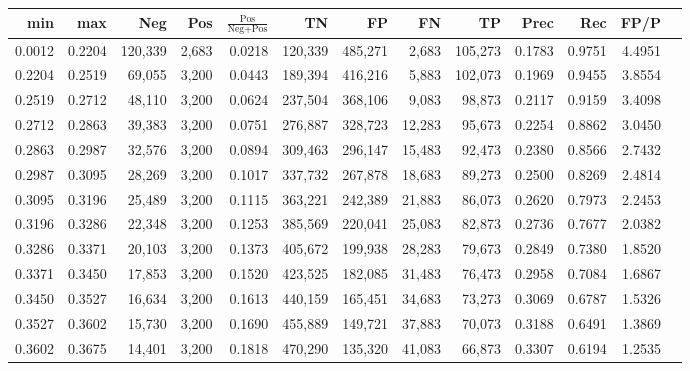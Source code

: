 \begin{tabular}{rrrrrrrrrrrrr}
\toprule
   min &    max &     Neg &   Pos & $\frac{\text{Pos}}{\text{Neg}+\text{Pos}}$ &      TN &      FP &      FN &      TP &   Prec &    Rec &   FP/P \\
\midrule
0.0012 & 0.2204 & 120,339 & 2,683 &                                     0.0218 & 120,339 & 485,271 &   2,683 & 105,273 & 0.1783 & 0.9751 & 4.4951 \\
0.2204 & 0.2519 &  69,055 & 3,200 &                                     0.0443 & 189,394 & 416,216 &   5,883 & 102,073 & 0.1969 & 0.9455 & 3.8554 \\
0.2519 & 0.2712 &  48,110 & 3,200 &                                     0.0624 & 237,504 & 368,106 &   9,083 &  98,873 & 0.2117 & 0.9159 & 3.4098 \\
0.2712 & 0.2863 &  39,383 & 3,200 &                                     0.0751 & 276,887 & 328,723 &  12,283 &  95,673 & 0.2254 & 0.8862 & 3.0450 \\
0.2863 & 0.2987 &  32,576 & 3,200 &                                     0.0894 & 309,463 & 296,147 &  15,483 &  92,473 & 0.2380 & 0.8566 & 2.7432 \\
0.2987 & 0.3095 &  28,269 & 3,200 &                                     0.1017 & 337,732 & 267,878 &  18,683 &  89,273 & 0.2500 & 0.8269 & 2.4814 \\
0.3095 & 0.3196 &  25,489 & 3,200 &                                     0.1115 & 363,221 & 242,389 &  21,883 &  86,073 & 0.2620 & 0.7973 & 2.2453 \\
0.3196 & 0.3286 &  22,348 & 3,200 &                                     0.1253 & 385,569 & 220,041 &  25,083 &  82,873 & 0.2736 & 0.7677 & 2.0382 \\
0.3286 & 0.3371 &  20,103 & 3,200 &                                     0.1373 & 405,672 & 199,938 &  28,283 &  79,673 & 0.2849 & 0.7380 & 1.8520 \\
0.3371 & 0.3450 &  17,853 & 3,200 &                                     0.1520 & 423,525 & 182,085 &  31,483 &  76,473 & 0.2958 & 0.7084 & 1.6867 \\
0.3450 & 0.3527 &  16,634 & 3,200 &                                     0.1613 & 440,159 & 165,451 &  34,683 &  73,273 & 0.3069 & 0.6787 & 1.5326 \\
0.3527 & 0.3602 &  15,730 & 3,200 &                                     0.1690 & 455,889 & 149,721 &  37,883 &  70,073 & 0.3188 & 0.6491 & 1.3869 \\
0.3602 & 0.3675 &  14,401 & 3,200 &                                     0.1818 & 470,290 & 135,320 &  41,083 &  66,873 & 0.3307 & 0.6194 & 1.2535 \\

\end{tabular}
